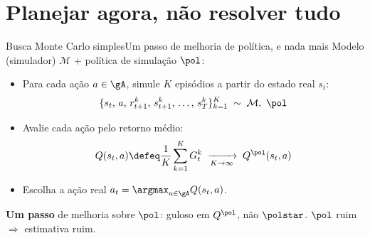 \documentclass[aspectratio=169, 10pt]{beamer}
\begin{document}
\section{Planejar agora, não resolver tudo}

\begin{frame}{Busca Monte Carlo simples}{Um passo de melhoria de política, e nada mais}
  \small
  Modelo (simulador) $\mathcal{M}$ + política de simulação $\pol$:
  \begin{itemize}
    \item Para cada ação $a \in \gA$, simule $K$ episódios a partir do estado real $s_t$:
      \[
        \{s_t,\, a,\, r^k_{t+1},\, s^k_{t+1},\, \ldots,\, s^k_T\}_{k=1}^{K} \;\sim\; \mathcal{M},\ \pol
      \]
    \item Avalie cada ação pelo retorno médio:
      \[
        Q(s_t,a) \defeq \frac{1}{K}\sum_{k=1}^{K} G^k_t \;\xrightarrow[K\to\infty]{}\; Q^{\pol}(s_t,a)
      \]
    \item Escolha a ação real $a_t = \argmax_{a \in \gA} Q(s_t,a)$.
  \end{itemize}

  \begin{alertabox}
    \textbf{Um passo} de melhoria sobre $\pol$: guloso em $Q^{\pol}$, não $\polstar$. $\pol$ ruim $\Rightarrow$ estimativa ruim.
  \end{alertabox}
\end{frame}
\end{document}
